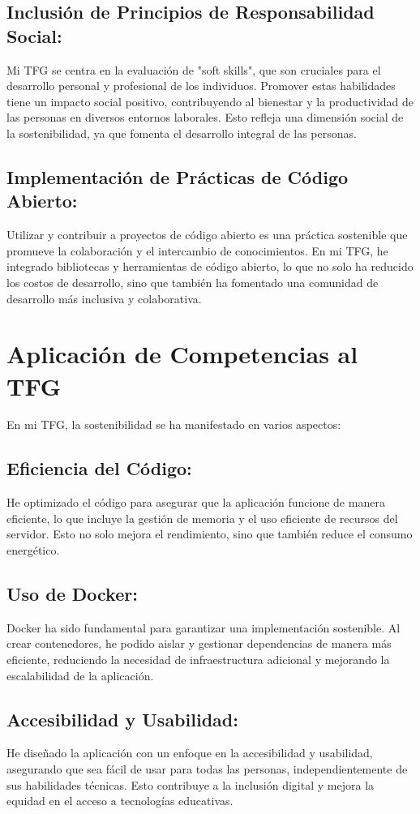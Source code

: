 \subsection{Inclusión de Principios de Responsabilidad Social:}
Mi TFG se centra en la evaluación de "soft skills", que son cruciales para el desarrollo personal y profesional de los individuos. Promover estas habilidades tiene un impacto social positivo, contribuyendo al bienestar y la productividad de las personas en diversos entornos laborales. Esto refleja una dimensión social de la sostenibilidad, ya que fomenta el desarrollo integral de las personas.

\subsection{Implementación de Prácticas de Código Abierto:}
Utilizar y contribuir a proyectos de código abierto es una práctica sostenible que promueve la colaboración y el intercambio de conocimientos. En mi TFG, he integrado bibliotecas y herramientas de código abierto, lo que no solo ha reducido los costos de desarrollo, sino que también ha fomentado una comunidad de desarrollo más inclusiva y colaborativa.

\section{Aplicación de Competencias al TFG}
En mi TFG, la sostenibilidad se ha manifestado en varios aspectos:

\subsection{Eficiencia del Código:}
He optimizado el código para asegurar que la aplicación funcione de manera eficiente, lo que incluye la gestión de memoria y el uso eficiente de recursos del servidor. Esto no solo mejora el rendimiento, sino que también reduce el consumo energético.

\subsection{Uso de Docker:}
Docker ha sido fundamental para garantizar una implementación sostenible. Al crear contenedores, he podido aislar y gestionar dependencias de manera más eficiente, reduciendo la necesidad de infraestructura adicional y mejorando la escalabilidad de la aplicación.

\subsection{Accesibilidad y Usabilidad:}
He diseñado la aplicación con un enfoque en la accesibilidad y usabilidad, asegurando que sea fácil de usar para todas las personas, independientemente de sus habilidades técnicas. Esto contribuye a la inclusión digital y mejora la equidad en el acceso a tecnologías educativas.

